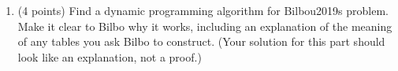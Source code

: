 \documentclass{letter}
\newenvironment{enumeratenumeric}{\begin{enumerate}[1.] }{\end{enumerate}}
\begin{document}
\begin{enumeratenumeric}
  \item (4 points) Find a dynamic programming algorithm for Bilbou2019s
  problem. Make it clear to Bilbo why it works, including an explanation of
  the meaning of any tables you ask Bilbo to construct. (Your solution for
  this part should look like an explanation, not a proof.)
  
  \\
  {\linebreak}{\linebreak}{\linebreak}{\linebreak}\\
  {\linebreak}{\linebreak}{\linebreak}{\linebreak}\\
  {\linebreak}{\linebreak}{\linebreak}{\linebreak}\\
  {\linebreak}{\linebreak}{\linebreak}{\linebreak}\\
  {\linebreak}{\linebreak}{\linebreak}{\linebreak}\\
  {\linebreak}{\linebreak}{\linebreak}{\linebreak}\\
  {\linebreak}{\linebreak}{\linebreak}{\linebreak}\\
  {\linebreak}{\linebreak}{\linebreak}{\linebreak}\\
  {\linebreak}{\linebreak}{\linebreak}{\linebreak}\\

\end{enumeratenumeric}
\end{document}

